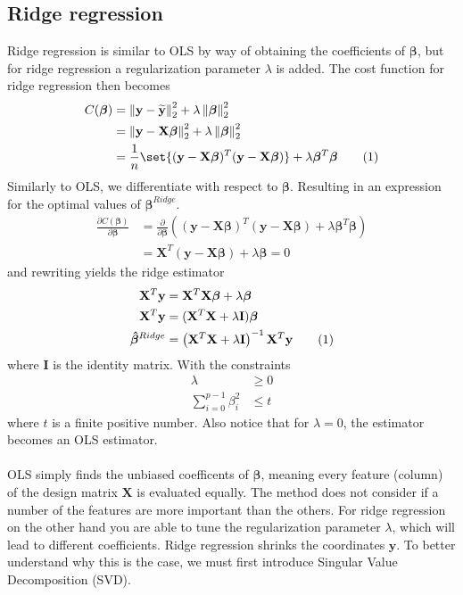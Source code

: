 \documentclass[oneside,10pt]{article}
\DeclarePairedDelimiter\set\{\}
\newcommand\numberthis{\addtocounter{equation}{1}\tag{\theequation}}
\newcommand{\y}{\mathbf{y}}
\newcommand{\ytilde}{\mathbf{\widetilde{y}}}
\newcommand{\X}{\mathbf{X}}
\newcommand{\B}{\boldsymbol{\beta}}
\newcommand{\Bhat}{\boldsymbol{\hat{\beta}}}
\newcommand{\norm}[1]{\left\lVert#1\right\rVert}
\begin{document}
\subsection{Ridge regression}
Ridge regression is similar to OLS by way of obtaining the coefficients of $\B$, but for ridge regression a regularization parameter $\lambda$ is added. The cost function for ridge regression then becomes
\begin{align*}
    C(\B) &= \norm{\y - \ytilde}_{2}^{2} + \lambda\norm{\B}_{2}^{2}\\
    &= \norm{\y - \X\B}_{2}^{2} + \lambda\norm{\B}_{2}^{2}\\
    &= \frac{1}{n}\set{(\y - \X\B)^{T}(\y - \X\B)} + \lambda\B^{T}\B \numberthis\label{eqn}
\end{align*}
Similarly to OLS, we differentiate with respect to $\B$. Resulting in an expression for the optimal values of $\B^{Ridge}$.
\begin{align*}
    \frac{\partial C(\B)}{\partial \B} &= \frac{\partial}{\partial \B}\left((\y - \X\B)^{T}(\y - \X\B) + \lambda\B^{T}\B\right)\\
    &= \X^{T}(\y - \X\B) + \lambda\B = 0
\end{align*}
and rewriting yields the ridge estimator
\begin{align*}
    \X^{T}\y &= \X^{T}\X\B + \lambda\B\\
    \X^{T}\y &= (\X^{T}\X + \lambda \mathbf{I})\B\\
    \Bhat^{Ridge} &= \left(\X^{T}\X + \lambda \mathbf{I}\right)^{-1}\X^{T}\y \numberthis\label{eqn}
\end{align*}
where $\mathbf{I}$ is the identity matrix. With the constraints
\begin{align*}
    \lambda &\geq 0\\
    \sum_{i=0}^{p-1}\beta_{i}^{2} &\leq t
\end{align*}
where $t$ is a finite positive number. Also notice that for $\lambda = 0$, the estimator becomes an OLS estimator. \\
\\
OLS simply finds the unbiased coefficents of $\B$, meaning every feature (column) of the design matrix $\X$ is evaluated equally. The method does not consider if a number of the features are more important than the others. For ridge regression on the other hand you are able to tune the regularization parameter $\lambda$, which will lead to different coefficients. Ridge regression shrinks the coordinates $\y$. To better understand why this is the case, we must first introduce Singular Value Decomposition (SVD).
\end{document}
